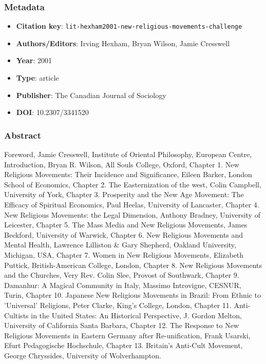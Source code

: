 \subsubsection*{Metadata}
\begin{itemize}
  \item \textbf{Citation key}: \texttt{lit-hexham2001-new-religious-movements-challenge}
  \item \textbf{Authors/Editors}: Irving Hexham, Bryan Wilson, Jamie Cresswell
  \item \textbf{Year}: 2001
  \item \textbf{Type}: article
  \item \textbf{Publisher}: The Canadian Journal of Sociology
  \item \textbf{DOI}: 10.2307/3341520
\end{itemize}
\subsubsection*{Abstract}
Foreword, Jamie Cresswell, Institute of Oriental Philosophy, European Centre, Introduction, Bryan R. Wilson, All Souls College, Oxford, Chapter 1. New Religious Movements: Their Incidence and Significance, Eileen Barker, London School of Economics, Chapter 2. The Easternization of the west, Colin Campbell, University of York, Chapter 3. Prosperity and the New Age Movement: The Efficacy of Spiritual Economics, Paul Heelas, University of Lancaster, Chapter 4. New Religious Movements: the Legal Dimension, Anthony Bradney, University of Leicester, Chapter 5. The Mass Media and New Religious Movements, James Beckford, University of Warwick, Chapter 6. New Religious Movements and Mental Health, Lawrence Lilliston \& Gary Shepherd, Oakland University, Michigan, USA, Chapter 7. Women in New Religious Movements, Elizabeth Puttick, British-American College, London, Chapter 8. New Religious Movements and the Churches, Very Rev. Colin Slee, Provost of Southwark, Chapter 9. Damanhur: A Magical Community in Italy, Massimo Introvigne, CESNUR, Turin, Chapter 10. Japanese New Religious Movements in Brazil: From Ethnic to 'Universal' Religions, Peter Clarke, King's College, London, Chapter 11. Anti-Cultists in the United States: An Historical Perspective, J. Gordon Melton, University of California Santa Barbara, Chapter 12. The Response to New Religious Movements in Eastern Germany after Re-unification, Frank Usarski, Efurt Pedagogische Hochschule, Chapter 13. Britain's Anti-Cult Movement, George Chryssides, University of Wolverhampton.


